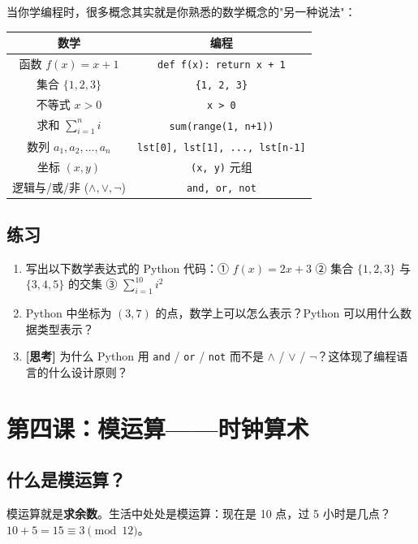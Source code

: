 \documentclass[a4paper,12pt]{ctexart}
\begin{document}
当你学编程时，很多概念其实就是你熟悉的数学概念的"另一种说法"：

\begin{center}
\begin{tabular}{|c|c|}
\hline
\textbf{数学} & \textbf{编程} \\ \hline
函数 $f(x) = x + 1$ & \texttt{def f(x): return x + 1} \\ \hline
集合 $\{1, 2, 3\}$ & \texttt{\{1, 2, 3\}} \\ \hline
不等式 $x > 0$ & \texttt{x > 0} \\ \hline
求和 $\sum_{i=1}^{n} i$ & \texttt{sum(range(1, n+1))} \\ \hline
数列 $a_1, a_2, \dots, a_n$ & \texttt{lst[0], lst[1], ..., lst[n-1]} \\ \hline
坐标 $(x, y)$ & \texttt{(x, y)} 元组 \\ \hline
逻辑与/或/非 ($\land, \lor, \lnot$) & \texttt{and, or, not} \\ \hline
\end{tabular}
\end{center}

\subsection*{练习}

\begin{enumerate}
  \item 写出以下数学表达式的 Python 代码：① $f(x) = 2x + 3$ ② 集合 $\{1, 2, 3\}$ 与 $\{3, 4, 5\}$ 的交集 ③ $\sum_{i=1}^{10} i^2$
  \item Python 中坐标为 $(3, 7)$ 的点，数学上可以怎么表示？Python 可以用什么数据类型表示？
  \item \textbf{[思考]} 为什么 Python 用 \texttt{and} / \texttt{or} / \texttt{not} 而不是 $\land$ / $\lor$ / $\lnot$？这体现了编程语言的什么设计原则？
\end{enumerate}

\section*{第四课：模运算——时钟算术}

\subsection*{什么是模运算？}

模运算就是\textbf{求余数}。生活中处处是模运算：现在是 10 点，过 5 小时是几点？$10 + 5 = 15 \equiv 3 \pmod{12}$。
\end{document}
